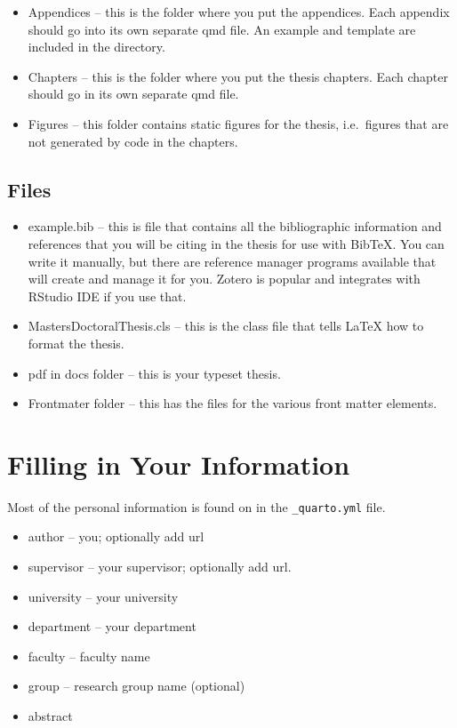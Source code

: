 \documentclass[
  letterpaper,
  11pt,
  english,
  singlespacing,
  headsepline]{MastersDoctoralThesis}
\providecommand{\tightlist}{%
  \setlength{\itemsep}{0pt}\setlength{\parskip}{0pt}}\usepackage{longtable,booktabs,array}
\begin{document}
\begin{itemize}
\item
  Appendices -- this is the folder where you put the appendices. Each
  appendix should go into its own separate qmd file. An example and
  template are included in the directory.
\item
  Chapters -- this is the folder where you put the thesis chapters. Each
  chapter should go in its own separate qmd file.
\item
  Figures -- this folder contains static figures for the thesis,
  i.e.~figures that are not generated by code in the chapters.
\end{itemize}

\subsection{Files}\label{files}

\begin{itemize}
\item
  example.bib -- this is file that contains all the bibliographic
  information and references that you will be citing in the thesis for
  use with BibTeX. You can write it manually, but there are reference
  manager programs available that will create and manage it for you.
  Zotero is popular and integrates with RStudio IDE if you use that.
\item
  MastersDoctoralThesis.cls -- this is the class file that tells
  \LaTeX{} how to format the thesis.
\item
  pdf in docs folder -- this is your typeset thesis.
\item
  Frontmater folder -- this has the files for the various front matter
  elements.
\end{itemize}

\section{Filling in Your Information}\label{filling-in-your-information}

Most of the personal information is found on in the
\texttt{\_quarto.yml} file.

\begin{itemize}
\tightlist
\item
  author -- you; optionally add url
\item
  supervisor -- your supervisor; optionally add url.
\item
  university -- your university
\item
  department -- your department
\item
  faculty -- faculty name
\item
  group -- research group name (optional)
\item
  abstract
\end{itemize}
\end{document}
